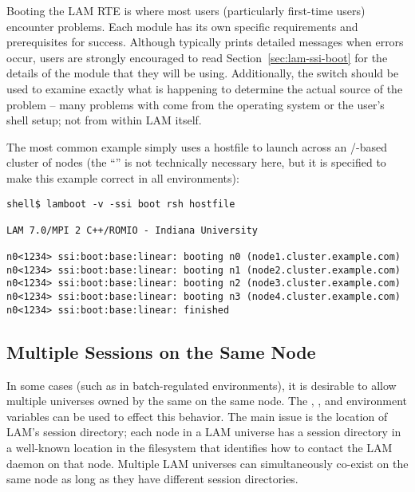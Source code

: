 Booting the LAM RTE is where most users (particularly first-time
users) encounter problems.  Each  module has its own
specific requirements and prerequisites for success.  Although
 typically prints detailed messages when errors occur,
users are strongly encouraged to read Section~\ref{sec:lam-ssi-boot}
for the details of the  module that they will be using.
Additionally, the  switch should be used to examine exactly
what is happening to determine the actual source of the problem --
many problems with  come from the operating system or the
user's shell setup; not from within LAM itself.

The most common  example simply uses a hostfile to launch
across an /-based cluster of nodes (the
``'' is not technically necessary here, but it
is specified to make this example correct in all environments):

\lstset{style=lam-cmdline}
\begin{lstlisting}
shell$ lamboot -v -ssi boot rsh hostfile

LAM 7.0/MPI 2 C++/ROMIO - Indiana University

n0<1234> ssi:boot:base:linear: booting n0 (node1.cluster.example.com)
n0<1234> ssi:boot:base:linear: booting n1 (node2.cluster.example.com)
n0<1234> ssi:boot:base:linear: booting n2 (node3.cluster.example.com)
n0<1234> ssi:boot:base:linear: booting n3 (node4.cluster.example.com)
n0<1234> ssi:boot:base:linear: finished
\end{lstlisting}


\subsection{Multiple Sessions on the Same Node}

In some cases (such as in batch-regulated environments), it is
desirable to allow multiple universes owned by the same on the same
node.  The ,
, and
 environment variables can be
used to effect this behavior.  The main issue is the location of LAM's
session directory; each node in a LAM universe has a session directory
in a well-known location in the filesystem that identifies how to
contact the LAM daemon on that node.  Multiple LAM universes can
simultaneously co-exist on the same node as long as they have
different session directories.

